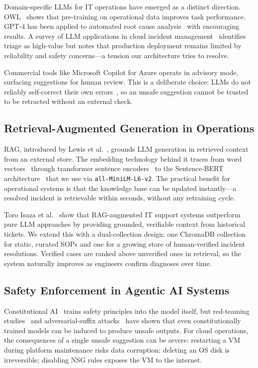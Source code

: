 \documentclass[a4paper,10pt,journal,compsoc]{IEEEtran}
\begin{document}
Domain-specific LLMs for IT operations have emerged as a distinct
direction. OWL~\cite{guo2024owl} shows that pre-training on
operational data improves task performance. GPT-4 has been applied to
automated root cause analysis~\cite{zhang2023automated} with
encouraging results. A survey of LLM applications in cloud incident
management~\cite{zeng2023aiops} identifies triage as high-value but
notes that production deployment remains limited by reliability and
safety concerns---a tension our architecture tries to resolve.

Commercial tools like Microsoft Copilot for Azure operate in advisory
mode, surfacing suggestions for human review. This is a deliberate
choice: LLMs do not reliably self-correct their own
errors~\cite{huang2024selfcorrect}, so an unsafe suggestion cannot be
trusted to be retracted without an external check.

\subsection{Retrieval-Augmented Generation in Operations}

RAG, introduced by Lewis et al.~\cite{lewis2020rag}, grounds LLM
generation in retrieved context from an external store. The embedding
technology behind it traces from word vectors~\cite{mikolov2013word2vec}
through transformer sentence encoders~\cite{devlin2019bert} to the
Sentence-BERT architecture~\cite{reimers2019sbert} that we use via
\texttt{all-MiniLM-L6-v2}. The practical benefit for operational
systems is that the knowledge base can be updated instantly---a
resolved incident is retrievable within seconds, without any
retraining cycle.

Toro Isaza et al.~\cite{isaza2024ragitsupport} show that RAG-augmented
IT support systems outperform pure LLM approaches by providing
grounded, verifiable context from historical tickets. We extend this
with a dual-collection design: one ChromaDB collection for static,
curated SOPs and one for a growing store of human-verified incident
resolutions. Verified cases are ranked above unverified ones in
retrieval, so the system naturally improves as engineers confirm
diagnoses over time.

\subsection{Safety Enforcement in Agentic AI Systems}

Constitutional AI~\cite{bai2022constitutional} trains safety
principles into the model itself, but red-teaming
studies~\cite{perez2022redteaming} and adversarial-suffix
attacks~\cite{zou2023universal} have shown that even constitutionally
trained models can be induced to produce unsafe outputs. For cloud
operations, the consequences of a single unsafe suggestion can be
severe: restarting a VM during platform maintenance risks data
corruption; deleting an OS disk is irreversible; disabling NSG rules
exposes the VM to the internet.
\end{document}
